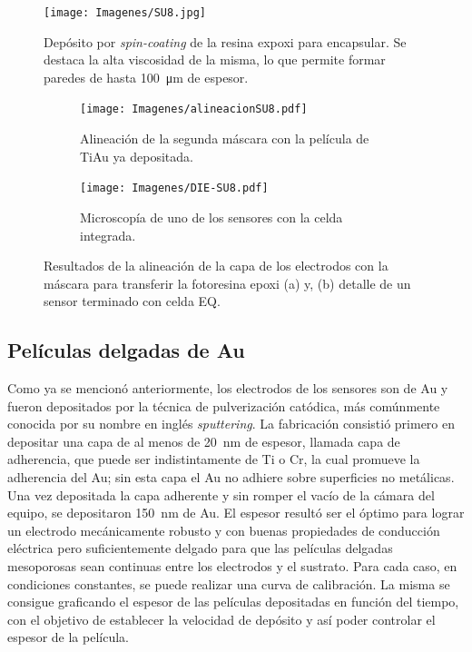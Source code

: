 			  	\begin{figure}[th!]
 				\centering
 				\texttt{[image: Imagenes/SU8.jpg]}
 				\caption[Depósito de la resina epoxi SU8]{Depósito por \textit{spin-coating }de la resina expoxi para encapsular. Se destaca la alta viscosidad de la misma, lo que permite formar paredes de hasta \SI{100}{\um} de espesor.}
 				\label{fig:su8}
 				\vspace*{6mm}
 				\end{figure}
 		
 				\begin{figure}[th!]
			 	   	    \centering
			 	   	    \begin{subfigure}[t]{0.495\textwidth}
			        	\texttt{[image: Imagenes/alineacionSU8.pdf]}
			       		\caption{Alineación de la segunda máscara con la película de Ti\textbar Au ya depositada.}
			         	\label{fig:alineacion}
			     		\end{subfigure}
			     		\begin{subfigure}[t]{0.495\textwidth}
			     		\texttt{[image: Imagenes/DIE-SU8.pdf]}
			    		\caption{Microscopía de uno de los sensores con la celda integrada.}
			     		\label{fig:die-su8}	
						\end{subfigure}
						\caption[Alineación y celda integrada en SU8]{Resultados de la alineación de la capa de los electrodos con la máscara para transferir la fotoresina epoxi (a) y, (b) detalle de un sensor terminado con celda EQ.}
			     		\label{fig:resultados-su8}
			     	   	\end{figure}

	\subsection{Películas delgadas de Au}

		 Como ya se mencionó anteriormente, los electrodos de los sensores son de Au y fueron depositados por la técnica de pulverización catódica, más comúnmente conocida por su nombre en inglés \textit{sputtering}. La fabricación consistió primero en depositar una capa de al menos de \SI{20}{\nm} de espesor, llamada capa de  adherencia, que puede ser indistintamente de Ti o Cr, la cual promueve la adherencia del Au; sin esta capa el Au no adhiere sobre superficies no metálicas.\cite{Hieber1976} Una vez depositada la capa adherente y sin romper el vacío de la cámara del equipo, se depositaron \SI{150}{nm} de Au. El espesor resultó ser el óptimo para lograr un electrodo mecánicamente robusto y con buenas propiedades de conducción eléctrica pero suficientemente delgado para que las películas delgadas mesoporosas sean continuas entre los electrodos y el sustrato. Para cada caso, en condiciones constantes, se puede realizar una curva de calibración. La misma se consigue graficando el espesor de las películas depositadas en función del tiempo, con el objetivo de establecer la velocidad de depósito y así poder controlar el espesor de la película. 

